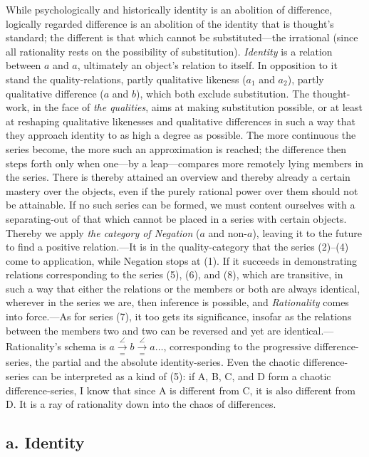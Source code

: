 \documentclass[12pt,a4paper]{book}
\newcommand{\opage}[1]{\marginnote{\footnotesize\textit{[#1]}}}
\begin{document}
While psychologically and historically identity is an abolition of
difference, logically regarded difference is an abolition of the identity
that is thought's standard; the different is that which cannot be
substituted---the irrational (since all rationality rests on the possibility
of substitution). \emph{Identity} is a relation between $a$ and $a$,
ultimately an object's relation to itself. In opposition to it stand the
quality-relations, partly qualitative likeness ($a_1$ and $a_2$), partly
qualitative difference ($a$ and $b$), which both exclude substitution. The
thought-work, in the face of \emph{the qualities}, aims at making
substitution possible, or at least at reshaping qualitative likenesses and
qualitative differences in such a way that they approach identity to as high
a degree as possible. The more continuous the series become, the more such
an approximation is reached; the difference then steps forth only when
one---by a leap---compares more remotely lying members in the series. There
is thereby attained an overview and thereby already a certain mastery over
the objects, even if the purely rational power over them should not be
attainable. If no such series can be formed, we must content ourselves with
a separating-out of that which cannot be placed in a series with certain
objects. Thereby we apply \emph{the category of Negation} ($a$ and
non-$a$), leaving it to the future to find a positive relation.---It is in
the quality-category that the series (2)--(4) come to application, while
Negation stops at (1). If it succeeds in demonstrating relations
corresponding to the series (5), (6), and (8), which are transitive, in such
a way that either the relations or the members or both are always identical,
wherever in the series we are, then inference is possible, and
\emph{Rationality} comes into force.---As for series (7), it too gets its
significance, insofar as the relations between the members two and two can be
reversed and yet are identical.---Rationality's schema is $a
\overset{\angle}{\underset{=}{\to}} b \overset{\angle}{\underset{=}{\to}} a
\ldots$, corresponding to the progressive difference-series, the partial and
the absolute identity-series. Even the chaotic difference-series can be
interpreted as a \opage{177}kind of (5): if A, B, C, and D form a chaotic
difference-series, I know that since A is different from C, it is also
different from D. It is a ray of rationality down into the chaos of
differences.

\subsection*{a. Identity}
\end{document}
